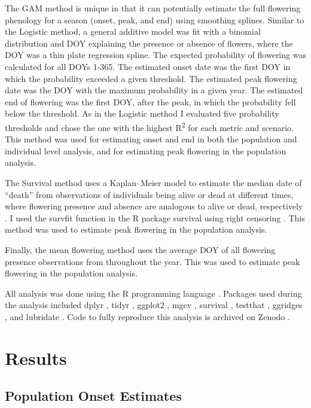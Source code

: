 The GAM method is unique in that it can potentially estimate the full flowering phenology for a season (onset, peak, and end) using smoothing splines. Similar to the Logistic method, a general additive model was fit with a binomial distribution and DOY explaining the presence or absence of flowers, where the DOY was a thin plate regression spline. The expected probability of flowering was calculated for all DOYs 1-365. The estimated onset date was the first DOY in which the probability exceeded a given threshold. The estimated peak flowering date was the DOY with the maximum probability in a given year. The estimated end of flowering was the first DOY, after the peak, in which the probability fell below the threshold. As in the Logistic method I evaluated five probability thresholds and chose the one with the highest R\textsuperscript{2} for each metric and scenario. This method was used for estimating onset and end in both the population and individual level analysis, and for estimating peak flowering in the population analysis. 

The Survival method uses a Kaplan–Meier model to estimate the median date of “death” from observations of individuals being alive or dead at different times, where flowering presence and absence are analogous to alive or dead, respectively \citep{templ2017}. I used the survfit function in the R package survival using right censoring \citep{Rsurvival}. This method was used to estimate peak flowering in the population analysis. 

Finally, the mean flowering method uses the average DOY of all flowering presence observations from throughout the year. This was used to estimate peak flowering in the population analysis. 

All analysis was done using the R programming language \citep{rcitation}. Packages used during the analysis included dplyr \citep{dplyr}, tidyr \citep{tidyr}, ggplot2 \citep{ggplot2}, mgcv \citep{mgcvGAM, mgcvTP}, survival \citep{Rsurvival}, testthat \citep{testthat}, ggridges \citep{ggridges}, and lubridate \citep{lubridate}. Code to fully reproduce this analysis is archived on Zenodo \citep{chap3zenodo}.

\section{Results}

\subsection{Population Onset Estimates}

